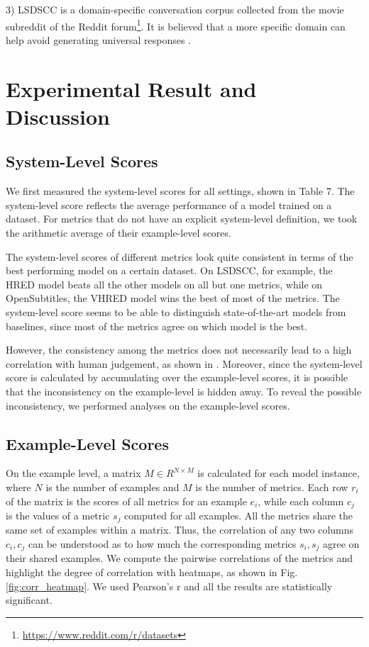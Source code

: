 \documentclass[conference]{IEEEtran}
\begin{document}
3) LSDSCC \cite{LSDSCC} is a domain-specific conversation corpus collected from the movie subreddit of the Reddit forum\footnote{\url{https://www.reddit.com/r/datasets}}.
It is believed that a more specific domain can help avoid generating universal responses \cite{LSDSCC}.


\section{Experimental Result and Discussion}
\subsection{System-Level Scores}
We first measured the system-level scores for all settings, shown in Table 7.
The system-level score reflects the average performance of a model trained on a dataset.
For metrics that do not have an explicit system-level definition, we took the arithmetic average of their example-level scores.


The system-level scores of different metrics look quite consistent in terms of the best performing model on a certain dataset.
On LSDSCC, for example, the HRED model beats all the other models on all but one metrics, while on OpenSubtitles, the VHRED model wins the best of most of the metrics.
The system-level score seems to be able to distinguish state-of-the-art models from baselines, since most of the metrics agree on which model is the best.

However, the consistency among the metrics does not necessarily lead to a high correlation with human judgement, as shown in \cite{HowNot}.
Moreover, since the system-level score is calculated by accumulating over the example-level scores, it is possible that the inconsistency on the example-level is hidden away.
To reveal the possible inconsistency, we performed analyses on the example-level scores.

\subsection{Example-Level Scores}
On the example level, a matrix $M \in R^{N \times M}$ is calculated for each model instance, where $N$ is the number of examples and $M$ is the number of metrics.
Each row $r_i$ of the matrix is the scores of all metrics for an example $e_i$, while each column $c_j$ is the values of a metric $s_j$ computed for all examples.
All the metrics share the same set of examples within a matrix.
Thus, the correlation of any two columns $c_i, c_j$ can be understood as to how much the corresponding metrics $s_i, s_j$ agree on their shared examples.
We compute the pairwise correlations of the metrics and highlight the degree of correlation with heatmaps, as shown in Fig. \ref{fig:corr_heatmap}.
We used Pearson's r and all the results are statistically significant.
\end{document}
